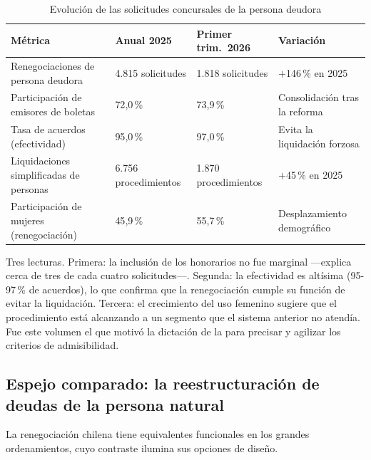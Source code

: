 \begin{table}[htbp]
\centering
\small
\caption{Evolución de las solicitudes concursales de la persona deudora}
\label{tab:cap06-estadisticas}
\begin{tabularx}{\textwidth}{@{}>{\raggedright\arraybackslash}p{} p{} p{} X@{}}
\toprule
\textbf{Métrica} & \textbf{Anual 2025} & \textbf{Primer trim.\ 2026} & \textbf{Variación} \\
\midrule
Renegociaciones de persona deudora & 4.815 solicitudes & 1.818 solicitudes
& $+$146\,\% en 2025 \\
\addlinespace
Participación de emisores de boletas & 72{,}0\,\% & 73{,}9\,\% & Consolidación tras la reforma \\
\addlinespace
Tasa de acuerdos (efectividad) & 95{,}0\,\% & 97{,}0\,\% & Evita la liquidación forzosa \\
\addlinespace
Liquidaciones simplificadas de personas & 6.756 procedimientos & 1.870 procedimientos
& $+$45\,\% en 2025 \\
\addlinespace
Participación de mujeres (renegociación) & 45{,}9\,\% & 55{,}7\,\% & Desplazamiento demográfico \\
\bottomrule
\end{tabularx}
\end{table}


\begin{foco}
Tres lecturas. Primera: la inclusión de los honorarios no fue marginal ---explica cerca de tres
de cada cuatro solicitudes---. Segunda: la efectividad es altísima (95-97\,\% de acuerdos), lo
que confirma que la renegociación cumple su función de evitar la liquidación. Tercera: el
crecimiento del uso femenino sugiere que el procedimiento está alcanzando a un segmento que el
sistema anterior no atendía. Fue este volumen el que motivó la dictación de la 
\citeyearpar{ncg-28} para precisar y agilizar los criterios de admisibilidad.
\end{foco}

\subsection{Espejo comparado: la reestructuración de deudas de la persona natural}

La renegociación chilena tiene equivalentes funcionales en los grandes ordenamientos, cuyo
contraste ilumina sus opciones de diseño.

